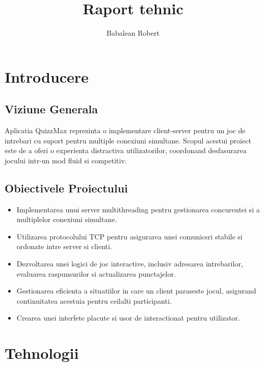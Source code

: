 \documentclass[runningheads]{llncs}
\begin{document}
%
\title{Raport tehnic}
%
%
\author{Babalean Robert}


\maketitle              %
%
%
%
%
\section{Introducere}

\subsection{Viziune Generala}
Aplicatia QuizzMax reprezinta o implementare client-server pentru un joc de intrebari cu suport pentru multiple conexiuni simultane. Scopul acestui proiect este de a oferi o experienta distractiva utilizatorilor, coordonand desfasurarea jocului intr-un mod fluid si competitiv.

\subsection{Obiectivele Proiectului}

\begin{itemize}[label=$\bullet$]
    \item Implementarea unui server multithreading pentru gestionarea concurentei si a multiplelor conexiuni simultane.
    \item Utilizarea protocolului TCP pentru asigurarea unei comunicsri stabile si ordonate intre server si clienti.
    \item Dezvoltarea unei logici de joc interactive, inclusiv adresarea intrebarilor, evaluarea raspunsurilor si actualizarea punctajelor.
    \item Gestionarea eficienta a situatiilor in care un client paraseste jocul, asigurand continuitatea acestuia pentru ceilalti participanti.
    \item Crearea unei interfete placute si usor de interactionat pentru utilizator.
\end{itemize}

\section{Tehnologii}
\end{document}
